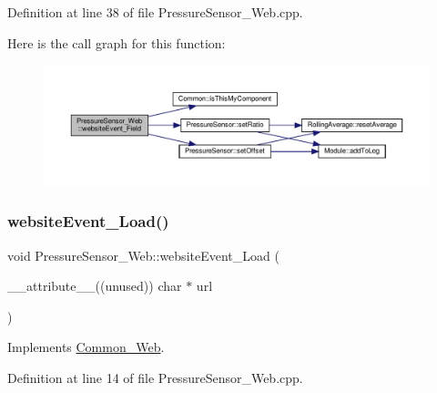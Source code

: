 Definition at line 38 of file Pressure\+Sensor\+\_\+\+Web.\+cpp.

Here is the call graph for this function\+:
\nopagebreak
\begin{figure}[H]
\begin{center}
\leavevmode
\includegraphics[width=350pt]{class_pressure_sensor___web_a0529277efb48cb5def4d6271d45a508f_cgraph}
\end{center}
\end{figure}
\mbox{\label{class_pressure_sensor___web_a235a466d2a93e7f53609c3113871c145}} 
\subsubsection{\texorpdfstring{website\+Event\+\_\+\+Load()}{websiteEvent\_Load()}}
{\footnotesize\ttfamily void Pressure\+Sensor\+\_\+\+Web\+::website\+Event\+\_\+\+Load (\begin{DoxyParamCaption}\item[{\+\_\+\+\_\+attribute\+\_\+\+\_\+((unused)) char $\ast$}]{url }\end{DoxyParamCaption})\hspace{0.3cm}{\ttfamily [virtual]}}



Implements \hyperlink{class_common___web_a5ce0d5ce6f63279c3b624371d8a76211}{Common\+\_\+\+Web}.



Definition at line 14 of file Pressure\+Sensor\+\_\+\+Web.\+cpp.


